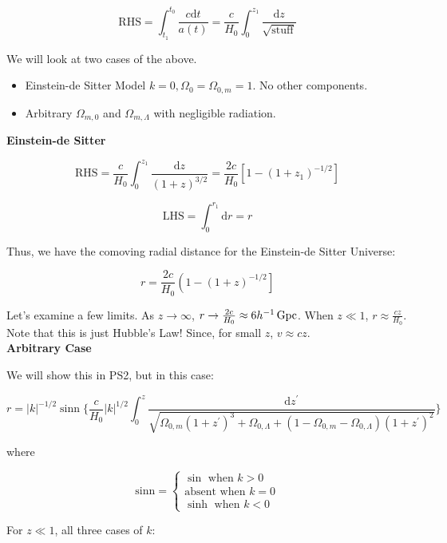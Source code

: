\documentclass{article}
\newcommand{\unit}[1]{{\,\rm #1}}
\newcommand{\be}{\begin{equation}}
\newcommand{\ee}{\end{equation}}
\newcommand{\Gpc}{\unit{Gpc}}
\begin{document}
\be
\text{RHS} = \int_{t_1}^{t_0} \frac{c\mathrm{d}t}{a(t)} = \frac{c}{H_0} \int_{0}^{z_1} \frac{\mathrm{d}z}{\sqrt{\text{stuff}}}
\ee

We will look at two cases of the above.

\begin{itemize}
    \item Einstein-de Sitter Model $k = 0, \Omega_0 = \Omega_{0,m} = 1$. No other components. 
    \item  Arbitrary $\Omega_{m,0}$ and $\Omega_{m,\Lambda}$ with negligible radiation. 
\end{itemize}

\noindent\textbf{Einstein-de Sitter}

\begin{equation}
\text{RHS} = \frac{c}{H_0}\int_0^{z_1} \frac{\mathrm{d}z}{(1+z)^{3/2}} = \frac{2c}{H_0}\left[1-(1+z_1)^{-1/2}\right]
\end{equation}

\begin{equation}
\text{LHS} = \int_0^{r_1} \mathrm{d}r = r
\end{equation}

Thus, we have the comoving radial distance for the Einstein-de Sitter Universe:

\be
\boxed{r = \frac{2c}{H_0}\left(1-\left(1+z\right)^{-1/2}\right]}
\ee

Let's examine a few limits. As $z\to\infty$, $r\to\frac{2c}{H_0} \approx 6 h^{-1} \Gpc$. When $z\ll1$, $r\approx \frac{cz}{H_0}$. Note that this is just Hubble's Law! Since, for small $z$, $v \approx cz$. \\

\noindent\textbf{Arbitrary Case}

We will show this in PS2, but in this case:

\be
\boxed{r = |k|^{-1/2} \operatorname{sinn}\{\frac{c}{H_0}|k|^{1/2} \int_0^{z} \frac{\mathrm{d}z^\prime}{\sqrt{\Omega_{0,m}\left(1+z^\prime\right)^3 + \Omega_{0,\Lambda} + \left(1-\Omega_{0,m}-\Omega_{0,\Lambda}\right)\left(1+z^\prime\right)^2}} \}}
\ee

where 

\be
\boxed{\text{sinn} = 
\begin{cases}
\sin \text{ when } k > 0 \\
\text{absent when } k = 0 \\
\sinh \text{ when } k < 0 
\end{cases}
}
\ee

For $z\ll1$, all three cases of $k$:
\end{document}
